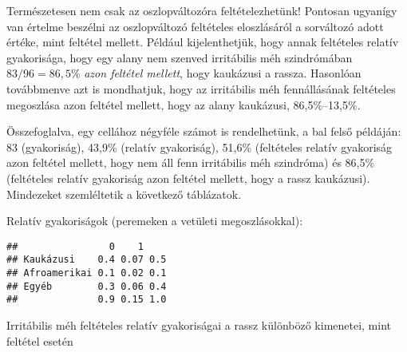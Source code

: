 \documentclass[
]{book}
\newenvironment{Shaded}{\begin{snugshade}}{\end{snugshade}}
\newcommand{\DecValTok}[1]{\textcolor[rgb]{0.00,0.00,0.81}{#1}}
\newcommand{\KeywordTok}[1]{\textcolor[rgb]{0.13,0.29,0.53}{\textbf{#1}}}
\newcommand{\NormalTok}[1]{#1}
\newcommand{\OperatorTok}[1]{\textcolor[rgb]{0.81,0.36,0.00}{\textbf{#1}}}
\newcommand{\StringTok}[1]{\textcolor[rgb]{0.31,0.60,0.02}{#1}}
\begin{document}
Természetesen nem csak az oszlopváltozóra feltételezhetünk! Pontosan ugyanígy van értelme beszélni az oszlopváltozó feltételes eloszlásáról a sorváltozó adott értéke, mint feltétel mellett. Például kijelenthetjük, hogy annak feltételes relatív gyakorisága, hogy egy alany nem szenved irritábilis méh szindrómában \(83/96=86,\!5\)\% \emph{azon feltétel mellett}, hogy kaukázusi a rassza. Hasonlóan továbbmenve azt is mondhatjuk, hogy az irritábilis méh fennállásának feltételes megoszlása azon feltétel mellett, hogy az alany kaukázusi, 86,5\%--13,5\%.

Összefoglalva, egy cellához négyféle számot is rendelhetünk, a bal felső példáján: 83 (gyakoriság), 43,9\% (relatív gyakoriság), 51,6\% (feltételes relatív gyakoriság azon feltétel mellett, hogy nem áll fenn irritábilis méh szindróma) és 86,5\% (feltételes relatív gyakoriság azon feltétel mellett, hogy a rassz kaukázusi). Mindezeket szemléltetik a következő táblázatok.

Relatív gyakoriságok (peremeken a vetületi megoszlásokkal):

\begin{Shaded}
\end{Shaded}

\begin{verbatim}
##                0    1    
## Kaukázusi    0.4 0.07 0.5
## Afroamerikai 0.1 0.02 0.1
## Egyéb        0.3 0.06 0.4
##              0.9 0.15 1.0
\end{verbatim}

Irritábilis méh feltételes relatív gyakoriságai a rassz különböző kimenetei, mint feltétel esetén

\begin{Shaded}
\end{Shaded}
\end{document}
